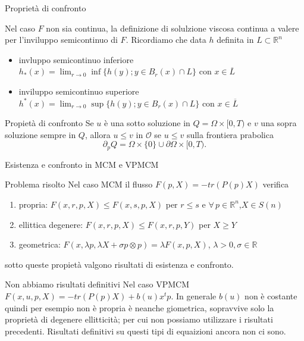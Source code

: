 \begin{frame}{Proprietà di confronto}
  \begin{osservazione}
    Nel caso $F$ non sia continua, la definizione di solulzione
    viscosa continua a valere per l'inviluppo semicontinuo di
    $F$. Ricordiamo che data $h$ definita in $L\subset\mathbb{R}^n$
    \begin{itemize}
    \item  invluppo semicontinuo inferiore $h_*(x)=\lim_{r\to
      0}\inf\{h(y); y\in B_r(x)\cap L\}$ con $x\in\overline{L}$
    \item inviluppo semicontinuo superiore $h^*(x)=\lim_{r\to
      0}\sup\{h(y);y\in B_r(x)\cap L\}$ con $x\in\overline{L}$
    \end{itemize}
  \end{osservazione}

  \begin{block}{Propietà di confronto}
    Se $u$ è una sotto soluzione in $Q=\Omega\times[0,T)$ e
      $v$ una sopra  soluzione sempre in $Q$,  allora $u\leq
      v$ in $\mathcal{O}$ se $u\leq v$ sulla frontiera prabolica 
    \[
    \partial_pQ=\Omega\times\{0\}\cup\partial\Omega\times[0,T).
    \]
  \end{block}
\end{frame}

\begin{frame}{Esistenza e confronto in MCM e VPMCM}
  \begin{block}{Problema risolto}
    Nel caso MCM il flusso $F(p,X)=-tr(P(p)X)$ verifica
    \begin{enumerate}
    \item \alert{propria}: $F(x,r,p,X)\leq F(x,s,p,X)$ per $r\leq
      s$ e $\forall\,p\in\mathbb{R}^n$,$X\in S(n)$
    \item \alert{ellittica degenere}: $F(x,r,p,X)\leq
      F(x,r,p,Y)$ per $X\geq Y$
    \item \alert{geometrica}: $F(x,\lambda p,\lambda X+\sigma
      p\otimes p)=\lambda F(x,p,X)$, $\lambda >0,\sigma\in\mathbb{R}$
    \end{enumerate}
    sotto queste propietà valgono risultati di esistenza e confronto.
  \end{block}
  \begin{block}{Non abbiamo risultati definitivi}
    Nel caso VPMCM $F(x,u,p,X)=-tr(P(p)X)+b(u)x^tp$. In generale
    $b(u)$ non è costante quindi per esempio non è
    \alert{propria} è neanche \alert{giometrica}, sopravvive solo la
    proprietà di \alert{degenere ellitticità}; per cui  non possiamo
    utilizzare i risultati precedenti. Risultati definitivi su
    questi tipi di equaizioni ancora non ci sono.
  \end{block}
\end{frame}

